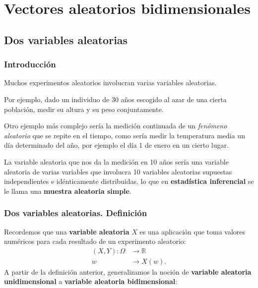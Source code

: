 \documentclass[]{book}
\begin{document}
\hypertarget{vectores-aleatorios-bidimensionales}{%
\chapter{Vectores aleatorios bidimensionales}\label{vectores-aleatorios-bidimensionales}}

\hypertarget{dos-variables-aleatorias}{%
\section{Dos variables aleatorias}\label{dos-variables-aleatorias}}

\hypertarget{introducciuxf3n-4}{%
\subsection{Introducción}\label{introducciuxf3n-4}}

Muchos experimentos aleatorios involucran varias variables aleatorias.

Por ejemplo, dado un individuo de 30 años escogido al azar de una cierta población, medir su altura y su peso conjuntamente.

Otro ejemplo más complejo sería la medición continuada de un \emph{fenómeno aleatorio} que se repite en el tiempo, como sería medir la temperatura media un día determinado del año, por ejemplo el día 1 de enero en un cierto lugar.

La variable aleatoria que nos da la medición en 10 años sería una variable aleatoria de varias variables que involucra 10 variables aleatorias supuestas independientes e idénticamente distribuidas, lo que en \textbf{estadística inferencial} se le llama una \textbf{muestra aleatoria simple}.

\hypertarget{dos-variables-aleatorias.-definiciuxf3n}{%
\subsection{Dos variables aleatorias. Definición}\label{dos-variables-aleatorias.-definiciuxf3n}}

Recordemos que una \textbf{variable aleatoria} \(X\) es una aplicación que toma valores numéricos para cada resultado de un experimento aleatorio:
\[
\begin{array}{rl}
(X,Y): \Omega & \longrightarrow \mathbb{R}\\
w & \longrightarrow X(w).
\end{array}
\]
A partir de la definición anterior, generalizamos la noción de \textbf{variable aleatoria unidimensional} a \textbf{variable aleatoria bidimensional}:
\end{document}

